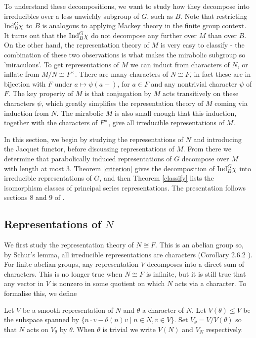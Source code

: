 To understand these decompositions, we want to study how they decompose into irreducibles over a less unwieldy subgroup of $G$, such as $B$. Note that restricting $\mathrm{Ind}_B^G \chi$ to $B$ is analogous to applying Mackey theory in the finite group context. It turns out that the $\mathrm{Ind}_B^G \chi$ do not decompose any further over $M$ than over $B$. On the other hand, the representation theory of $M$ is very easy to classify - the combination of these two observations is what makes the mirabolic subgroup so 'miraculous'. To get representations of $M$ we can induct from characters of $N$, or inflate from $M/N\cong F^\times$. There are many characters of $N\cong F$, in fact these are in bijection with $F$ under $a \mapsto \psi(a-)$, for $a \in F$ and any nontrivial character $\psi$ of $F$. The key property of $M$ is that conjugation by $M$ acts transitively on these characters $\psi$, which greatly simplifies the representation theory of $M$ coming via induction from $N$. The mirabolic $M$ is also small enough that this induction, together with the characters of $F^\times$, give all irreducible representations of $M$.

In this section, we begin by studying the representations of $N$ and introducing the Jacquet functor, before discussing representations of $M$. From there we determine that parabolically induced representations of $G$ decompose over $M$ with length at most 3. Theorem \ref{criterion} gives the decomposition of $\mathrm{Ind}_B^G \chi$ into irreducible representations of $G$, and then Theorem \ref{classify} lists the isomorphism classes of principal series representations. The presentation follows sections 8 and 9 of \cite{BH1}.

\subsection{Representations of $N$}

We first study the representation theory of $N \cong F$. This is an abelian group so, by Schur's lemma, all irreducible representations are characters (Corollary 2.6.2 \cite{BH1}). For finite abelian groups, any representation $V$ decomposes into a direct sum of characters. This is no longer true when $N\cong F$ is infinite, but it is still true that any vector in $V$ is nonzero in some quotient on which $N$ acts via a character. To formalise this, we define

\begin{notn}
    Let $V$ be a smooth representation of $N$ and $\theta$ a character of $N$. Let $V(\theta) \leq V$ be the subspace spanned by $\{n\cdot v - \theta(n)v \mid n \in N, v \in V\}$. Set $V_\theta = V/V(\theta)$ so that $N$ acts on $V_\theta$ by $\theta$. When $\theta$ is trivial we write $V(N)$ and $V_N$ respectively. 
\end{notn}


